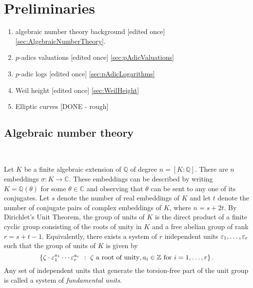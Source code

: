 
\chapter{Preliminaries}
\label{ch:Preliminaries}

\begin{enumerate}
\item algebraic number theory background [edited once] \autoref{sec:AlgebraicNumberTheory}.
\item $p$-adics valuations [edited once] \autoref{sec:pAdicValuations}
\item $p$-adic logs [edited once] \autoref{sec:pAdicLogarithms}
\item Weil height [edited once] \autoref{sec:WeilHeight}
\item Elliptic curves [DONE - rough]
\end{enumerate}


\section{Algebraic number theory} 
\label{sec:AlgebraicNumberTheory}

\\

Let $K$ be a finite algebraic extension of $\mathbb{Q}$ of degree $n = [K:\mathbb{Q}]$. There are $n$ embeddings $\sigma: K \to \mathbb{C}$. These embeddings can be described by writing $K = \mathbb{Q}(\theta)$ for some $\theta \in \mathbb{C}$ and observing that $\theta$ can be sent to any one of its conjugates. 
Let $s$ denote the number of real embeddings of $K$ and let $t$ denote the number of conjugate pairs of complex embeddings of $K$, where $n = s + 2t$. By Dirichlet's Unit Theorem, the group of units of $K$ is the direct product of a finite cyclic group consisting of the roots of unity in $K$ and a free abelian group of rank $r = s + t -1$. Equivalently, there exists a system of $r$ independent units $\varepsilon_1, \dots, \varepsilon_r$ such that the group of units of $K$ is given by 
\[\left\{\zeta \cdot \varepsilon_1^{a_1}\cdots \varepsilon_r^{a_r} \ : \ \zeta \text{ a root of unity}, a_i \in \mathbb{Z} \text{ for } i = 1, \dots, r\right\}.\]
Any set of independent units that generate the torsion-free part of the unit group is called a system of \textit{fundamental units}. 

